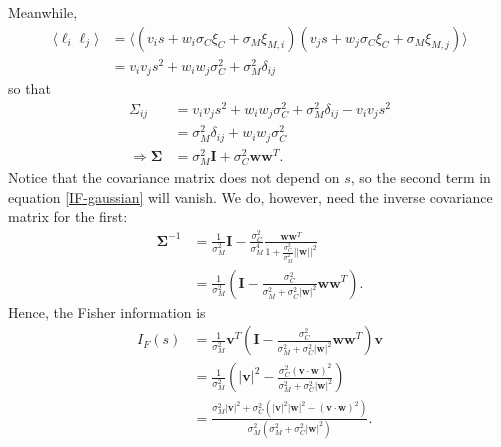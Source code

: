 \documentclass[11pt]{article}
\begin{document}
	Meanwhile,
	\begin{align}
		\langle \ell_i \ell_j \rangle &= \langle (v_i s + w_i \sigma_C\xi_C + \sigma_M\xi_{M,i}) (v_j s + w_j \sigma_C\xi_C + \sigma_M\xi_{M,j})\rangle \\
		&= v_i v_j s^2 + w_i w_j \sigma_C^2 + \sigma_M^2 \delta_{ij}
	\end{align}
	so that
	\begin{align}
		\Sigma_{ij} &= v_i v_j s^2 + w_i w_j \sigma_C^2 + \sigma_M^2 \delta_{ij} - v_i v_j s^2 \\
		&= \sigma_M^2 \delta_{ij} + w_i w_j \sigma_C^2 \\
		\Rightarrow \boldsymbol{\Sigma} &= \sigma_M^2 \mathbf{I} + \sigma_C^2\mathbf{ww}^T.
	\end{align}
	Notice that the covariance matrix does not depend on $s$, so the second term in equation \eqref{IF-gaussian} will vanish. We do, however, need the inverse covariance matrix for the first:
	\begin{align}
		\boldsymbol{\Sigma}^{-1} &= \frac{1}{\sigma_M^2} \mathbf{I} - \frac{\sigma_C^2}{\sigma_M^4} \frac{\mathbf{ww}^T}{1+\frac{\sigma_C^2}{\sigma_M^2}||\mathbf{w}||^2}\\
		&= \frac{1}{\sigma_M^2}\left(\mathbf{I} - \frac{\sigma_C^2}{\sigma_M^2 + \sigma_C^2 |\mathbf{w}|^2}\mathbf{ww}^T\right).
	\end{align}
	Hence, the Fisher information is
	\begin{align}
		I_{F}(s) &= \frac{1}{\sigma_M^2}\mathbf{v}^T \left(\mathbf{I} - \frac{\sigma_C^2}{\sigma_M^2 + \sigma_C^2 |\mathbf{w}|^2}\mathbf{ww}^T\right) \mathbf{v} \\
		&= \frac{1}{\sigma_M^2} \left(|\mathbf{v}|^2 - \frac{\sigma_C^2 (\mathbf{v}\cdot\mathbf{w})^2}{\sigma_M^2 + \sigma_C^2 |\mathbf{w}|^2}\right) \\
		&= \frac{\sigma_M^2 |\mathbf{v}|^2 + \sigma_C^2 \left(|\mathbf{v}|^2|\mathbf{w}|^2 - (\mathbf{v}\cdot\mathbf{w})^2\right)}{\sigma_M^2 (\sigma_M^2 + \sigma_C^2 |\mathbf{w}|^2)}.
	\end{align}
	\newpage
\end{document}
